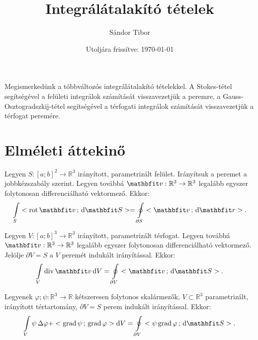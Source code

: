 \documentclass[lang=magyar]{math-handout}
\title{Integrálátalakító tételek}
\date{Utoljára frissítve: \today}
\author{Sándor Tibor}
\begin{document}
\allowdisplaybreaks

\maketitle

\vspace{1em}

\begin{summary}
  Megismerkedünk a többváltozós integrálátalakító tételekkel. A Stokes-tétel
  segítségével a felületi integrálok számítását visszavezetjük a peremre, a
  Gauss-Osz\-to\-grad\-szkij-tétel segítségével a térfogati integrálok számítását
  visszavezetjük a térfogat peremére.
\end{summary}

\vspace{-1em}

\section{Elméleti áttekinő}

\vspace{1em}

\begin{theorem}
  Legyen $S : [a;b]^2 \rightarrow \mathbb R^3$ irányított,
  parametrizált felület. Irányítsuk a peremet a jobbkézszabály szerint.
  Legyen továbbá $\rvec v : \mathbb R^3 \rightarrow \mathbb R^3$ legalább
  egyszer folytonosan differenciálható vektormező. Ekkor:
  \[
    \int \limits_S \scalar{\rot \rvec v}{\diff \rvec S}
    =
    \oint \limits_{\partial S} \scalar{\rvec v}{\diff \rvec r}
    \text.
  \]
\end{theorem}

\vfill

\begin{theorem}
  Legyen $V : [a;b]^3 \rightarrow \mathbb R^3$ irányított, parametrizált
  térfogat. Legyen továbbá $\rvec v : \mathbb R^3 \rightarrow \mathbb R^3$
  legalább egyszer folytonosan differenciálható vektormező. Jelölje
  $\partial V = S$ a $V$ peremét indukált irányítással. Ekkor:
  \[
    \int \limits_V \Div \rvec v \, \diff V
    =
    \oint \limits_{\partial V} \scalar{\rvec v}{\diff \rvec S}
    \text.
  \]
\end{theorem}

\vfill

\begin{theorem}
  Legyenek $\varphi; \psi: \mathbb R^3 \rightarrow \mathbb R$ kétszeresen
  folytonos skalármezők, $V \subset \mathbb R^3$ parametrizált, irányított
  tértartomány, $\partial V = S$ perem indukált irányítással. Ekkor:
  \[
    \int \limits_V
    \psi \, \Delta \varphi +
    \scalar{\grad \psi}{\grad \varphi}
    \diff V
    =
    \oint \limits_{\partial V} \scalar{\psi \grad \varphi}{\diff \rvec S}
    \text.
  \]
\end{theorem}
\end{document}
